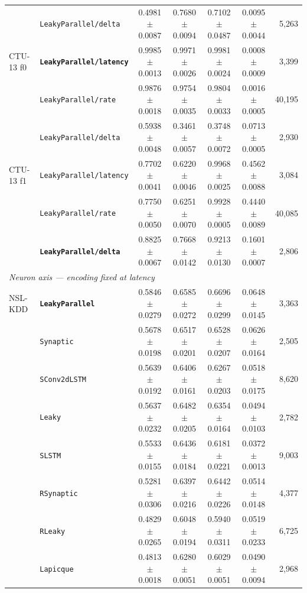 \begin{table}[t]
{\begin{tabular}{l l c c c c r}
 & \texttt{LeakyParallel/delta} & 0.4981 $\pm$ 0.0087 & 0.7680 $\pm$ 0.0094 & 0.7102 $\pm$ 0.0487 & 0.0095 $\pm$ 0.0044 & 5{,}263 \\
CTU-13 f0 & \textbf{\texttt{LeakyParallel/latency}} & 0.9985 $\pm$ 0.0013 & 0.9971 $\pm$ 0.0026 & 0.9981 $\pm$ 0.0024 & 0.0008 $\pm$ 0.0009 & 3{,}399 \\
 & \texttt{LeakyParallel/rate} & 0.9876 $\pm$ 0.0018 & 0.9754 $\pm$ 0.0035 & 0.9804 $\pm$ 0.0033 & 0.0016 $\pm$ 0.0005 & 40{,}195 \\
 & \texttt{LeakyParallel/delta} & 0.5938 $\pm$ 0.0048 & 0.3461 $\pm$ 0.0057 & 0.3748 $\pm$ 0.0072 & 0.0713 $\pm$ 0.0005 & 2{,}930 \\
CTU-13 f1 & \texttt{LeakyParallel/latency} & 0.7702 $\pm$ 0.0041 & 0.6220 $\pm$ 0.0046 & 0.9968 $\pm$ 0.0025 & 0.4562 $\pm$ 0.0088 & 3{,}084 \\
 & \texttt{LeakyParallel/rate} & 0.7750 $\pm$ 0.0050 & 0.6251 $\pm$ 0.0070 & 0.9928 $\pm$ 0.0005 & 0.4440 $\pm$ 0.0089 & 40{,}085 \\
 & \textbf{\texttt{LeakyParallel/delta}} & 0.8825 $\pm$ 0.0067 & 0.7668 $\pm$ 0.0142 & 0.9213 $\pm$ 0.0130 & 0.1601 $\pm$ 0.0007 & 2{,}806 \\
\midrule
\multicolumn{7}{l}{\textit{Neuron axis --- encoding fixed at latency}} \\
\midrule
NSL-KDD & \textbf{\texttt{LeakyParallel}} & 0.5846 $\pm$ 0.0279 & 0.6585 $\pm$ 0.0272 & 0.6696 $\pm$ 0.0299 & 0.0648 $\pm$ 0.0145 & 3{,}363 \\
 & \texttt{Synaptic} & 0.5678 $\pm$ 0.0198 & 0.6517 $\pm$ 0.0201 & 0.6528 $\pm$ 0.0207 & 0.0626 $\pm$ 0.0164 & 2{,}505 \\
 & \texttt{SConv2dLSTM} & 0.5639 $\pm$ 0.0192 & 0.6406 $\pm$ 0.0161 & 0.6267 $\pm$ 0.0203 & 0.0518 $\pm$ 0.0175 & 8{,}620 \\
 & \texttt{Leaky} & 0.5637 $\pm$ 0.0232 & 0.6482 $\pm$ 0.0205 & 0.6354 $\pm$ 0.0164 & 0.0494 $\pm$ 0.0103 & 2{,}782 \\
 & \texttt{SLSTM} & 0.5533 $\pm$ 0.0155 & 0.6436 $\pm$ 0.0184 & 0.6181 $\pm$ 0.0221 & 0.0372 $\pm$ 0.0013 & 9{,}003 \\
 & \texttt{RSynaptic} & 0.5281 $\pm$ 0.0306 & 0.6397 $\pm$ 0.0216 & 0.6442 $\pm$ 0.0226 & 0.0514 $\pm$ 0.0148 & 4{,}377 \\
 & \texttt{RLeaky} & 0.4829 $\pm$ 0.0265 & 0.6048 $\pm$ 0.0194 & 0.5940 $\pm$ 0.0311 & 0.0519 $\pm$ 0.0233 & 6{,}725 \\
 & \texttt{Lapicque} & 0.4813 $\pm$ 0.0018 & 0.6280 $\pm$ 0.0051 & 0.6029 $\pm$ 0.0051 & 0.0490 $\pm$ 0.0094 & 2{,}968 \\

\end{tabular}}
\end{table}

